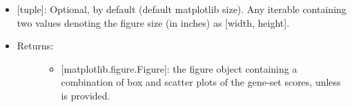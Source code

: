 \documentclass[letterpaper,10pt,english]{sphinxmanual}
\begin{document}
\begin{fulllineitems}
\begin{itemize}
\begin{description}
\begin{itemize}
\item {} 
 {[}tuple{]}: Optional,  by default (default
matplotlib size). Any iterable containing two values denoting
the figure size (in inches) as {[}width, height{]}.

\end{itemize}

\end{description}

\end{itemize}
\begin{itemize}
\item {} \begin{description}
\item[{Returns:}] \leavevmode\begin{itemize}
\item {} 
{[}matplotlib.figure.Figure{]}: the figure object containing a
combination of box and scatter plots of the gene-set scores,
unless  is provided.

\end{itemize}

\end{description}

\end{itemize}

\end{fulllineitems}

\end{document}
